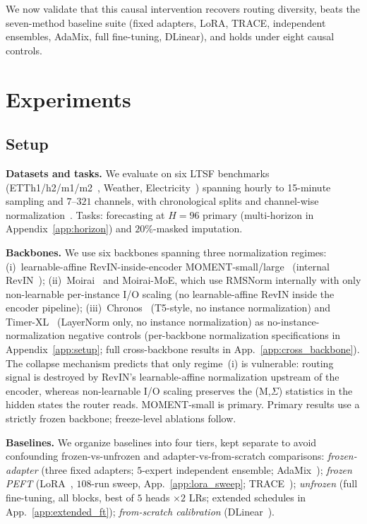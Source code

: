 \documentclass{article}
\begin{document}
We now validate that this causal intervention recovers routing diversity, beats the seven-method baseline suite (fixed adapters, LoRA, TRACE, independent ensembles, AdaMix, full fine-tuning, DLinear), and holds under eight causal controls.

\section{Experiments}

\subsection{Setup}

\textbf{Datasets and tasks.} We evaluate on six LTSF benchmarks (ETTh1/h2/m1/m2~\citep{zhou2021informer}, Weather, Electricity~\citep{wu2021autoformer}) spanning hourly to 15-minute sampling and $7$--$321$ channels, with chronological splits and channel-wise normalization~\citep{nie2023patchtst}. Tasks: forecasting at $H{=}96$ primary (multi-horizon in Appendix~\ref{app:horizon}) and $20\%$-masked imputation.

\textbf{Backbones.} We use six backbones spanning three normalization regimes: (i)~learnable-affine RevIN-inside-encoder MOMENT-small/large~\citep{goswami2024moment} (internal RevIN~\citep{kim2021revin}); (ii)~Moirai~\citep{woo2024moirai} and Moirai-MoE, which use RMSNorm internally with only non-learnable per-instance I/O scaling (no learnable-affine RevIN inside the encoder pipeline); (iii)~Chronos~\citep{ansari2024chronos} (T5-style, no instance normalization) and Timer-XL~\citep{liu2025timerxl} (LayerNorm only, no instance normalization) as no-instance-normalization negative controls (per-backbone normalization specifications in Appendix~\ref{app:setup}; full cross-backbone results in App.~\ref{app:cross_backbone}). The collapse mechanism predicts that only regime~(i) is vulnerable: routing signal is destroyed by RevIN's learnable-affine normalization upstream of the encoder, whereas non-learnable I/O scaling preserves the (M,$\Sigma$) statistics in the hidden states the router reads. MOMENT-small is primary. Primary results use a strictly frozen backbone; freeze-level ablations follow.

\textbf{Baselines.} We organize baselines into four tiers, kept separate to avoid confounding frozen-vs-unfrozen and adapter-vs-from-scratch comparisons: \emph{frozen-adapter} (three fixed adapters; $5$-expert independent ensemble; AdaMix~\citep{wang2022adamix}); \emph{frozen PEFT} (LoRA~\citep{hu2022lora}, $108$-run sweep, App.~\ref{app:lora_sweep}; TRACE~\citep{li2025trace}); \emph{unfrozen} (full fine-tuning, all blocks, best of $5$ heads $\times 2$ LRs; extended schedules in App.~\ref{app:extended_ft}); \emph{from-scratch calibration} (DLinear~\citep{zeng2023dlinear}).
\end{document}
